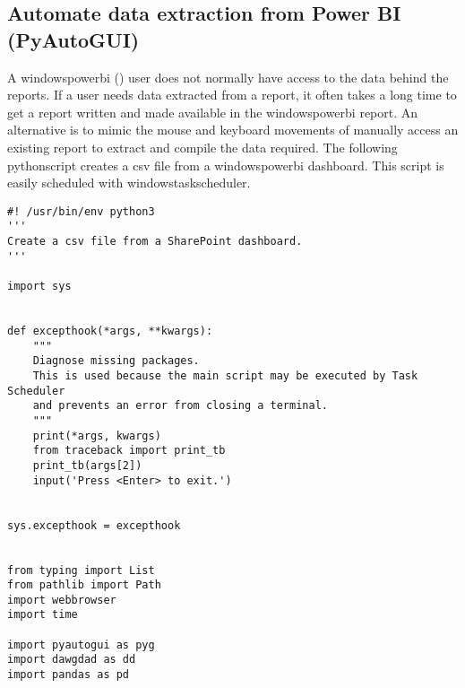 \documentclass[10pt, letterpaper, twoside]{article}
\begin{document}
\subsection{Automate data extraction from Power BI (PyAutoGUI)}\label{sec:automate_data_extraction_from_power_bi}
A \Gls{windowspowerbi} (\cite{windowspowerbi}) user does not normally have access to the data behind the reports. If a user needs data extracted from a report, it often takes a long time to get a report written and made available in the \Gls{windowspowerbi} report. An alternative is to mimic the mouse and keyboard movements of manually access an existing report to extract and compile the data required. The following \Gls{pythonscript} creates a csv file from a \Gls{windowspowerbi} dashboard. This script is easily scheduled with \Gls{windowstaskscheduler}.
\begin{footnotesize}
\begin{verbatim}
#! /usr/bin/env python3
'''
Create a csv file from a SharePoint dashboard.
'''

import sys


def excepthook(*args, **kwargs):
    """
    Diagnose missing packages.
    This is used because the main script may be executed by Task Scheduler
    and prevents an error from closing a terminal.
    """
    print(*args, kwargs)
    from traceback import print_tb
    print_tb(args[2])
    input('Press <Enter> to exit.')


sys.excepthook = excepthook


from typing import List
from pathlib import Path
import webbrowser
import time

import pyautogui as pyg
import dawgdad as dd
import pandas as pd



\end{verbatim}
\end{footnotesize}
\end{document}
